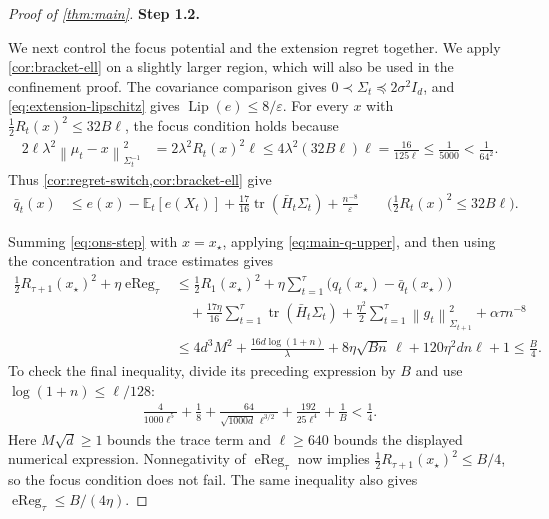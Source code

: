 \documentclass{article}
\newcommand{\proofstepinline}[1]{%
    {\normalfont\normalsize\bfseries\color{blue!55!black}Step #1.}\enspace
}
\newcommand{\E}{\mathbb E}
\newcommand{\tr}{\operatorname{tr}}
\newcommand{\Lip}{\operatorname{Lip}}
\newcommand{\1}{\mathbf 1}
\newcommand{\eps}{\varepsilon}
\newcommand{\normm}[2]{\left\lVert #1\right\rVert_{#2}}
\begin{document}
\begin{proof}[Proof of \cref{thm:main}]
    \proofstepinline{1.2}
    We next control the focus potential and the extension regret together.
    We apply \cref{cor:bracket-ell} on a slightly larger region, which
    will also be used in the confinement proof. The covariance comparison
    gives $0\prec\Sigma_t\preceq2\sigma^2I_d$, and
    \eqref{eq:extension-lipschitz} gives $\Lip(e)\leq8/\eps$.
    For every $x$ with $\frac12R_t(x)^2\leq32B\ell$, the focus condition holds because
    \begin{align}
        2\ell\lambda^2\normm{\mu_t-x}{\Sigma_t^{-1}}^2
         & =2\lambda^2R_t(x)^2\ell
        \leq4\lambda^2(32B\ell)\ell
        =\frac{16}{125\ell}
        \leq\frac1{5000}<\frac1{64^2}.
        \label{eq:main-stability-bracket-focus}
    \end{align}
    Thus \cref{cor:regret-switch,cor:bracket-ell} give
    \begin{align}
        \bar{q}_t(x)
         & \leq e(x)-\E_t[e(X_t)]
        +\frac{17}{16}\tr(\bar{H}_t\Sigma_t)+\frac{n^{-8}}{\eps}
        \qquad\bigl(\tfrac12R_t(x)^2\leq32B\ell\bigr).
        \label{eq:main-q-upper}
    \end{align}

    Summing \eqref{eq:ons-step} with $x=x_\star$, applying
    \eqref{eq:main-q-upper}, and then using the concentration and trace
    estimates gives
    \begin{align}
        \frac12R_{\tau+1}(x_\star)^2+\eta\operatorname{eReg}_\tau
         & \leq \frac12R_1(x_\star)^2
        +\eta\sum_{t=1}^\tau
        \bigl(q_t(x_\star)-\bar{q}_t(x_\star)\bigr)
        \nonumber                                                       \\
         & \quad+\frac{17\eta}{16}\sum_{t=1}^\tau\tr(\bar{H}_t\Sigma_t)
        +\frac{\eta^2}{2}\sum_{t=1}^\tau
        \normm{g_t}{\Sigma_{t+1}}^2
        +\alpha\tau n^{-8}
        \nonumber                                                       \\
         & \leq4d^3M^2
        +\frac{16d\log(1+n)}{\lambda}
        +8\eta\sqrt{Bn}\,\ell
        +120\eta^2dn\ell+1
        \leq\frac B4.
        \label{eq:main-focus-decomposition}
    \end{align}
    To check the final inequality, divide its preceding expression by
    $B$ and use $\log(1+n)\leq\ell/128$:
    \begin{align}
        \frac{4}{1000\ell^5}
        +\frac18
        +\frac{64}{\sqrt{1000d}\,\ell^{3/2}}
        +\frac{192}{25\ell^4}
        +\frac1B
        <\frac14.
        \label{eq:main-budget-check}
    \end{align}
    Here $M\sqrt d\geq1$ bounds the trace term and
    $\ell\geq640$ bounds the displayed numerical expression.
    Nonnegativity of $\operatorname{eReg}_\tau$ now implies
    $\frac12R_{\tau+1}(x_\star)^2\leq B/4$, so the focus condition does not fail.
    The same inequality also gives $\operatorname{eReg}_\tau\leq B/(4\eta)$.


\end{proof}
\end{document}
